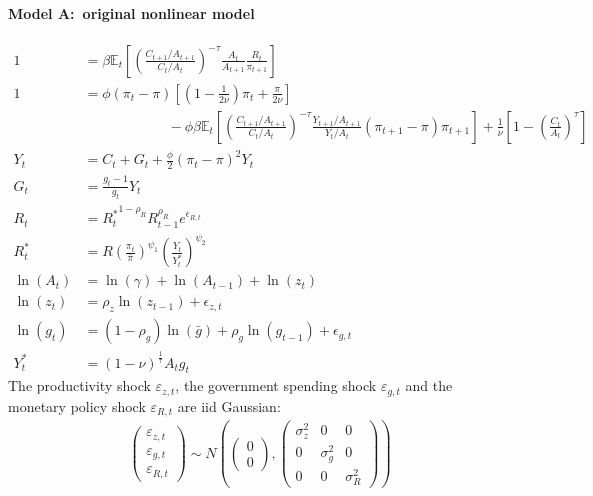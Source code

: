 \paragraph{Model A:\ original nonlinear model}
\begin{align}
1 &= \beta \mathbb{E}_t\left[{\left(\frac{C_{t+1}/A_{t+1}}{C_t/A_t}\right)}^{-\tau} \frac{A_t}{A_{t+1}} \frac{R_t}{\pi_{t+1}}\right]
\\
1 &= \phi \left(\pi_t - \pi\right) \left[\left(1-\frac{1}{2\nu}\right)\pi_t + \frac{\pi}{2\nu}\right] \nonumber
\\&\qquad\qquad\qquad
- \phi \beta \mathbb{E}_t \left[{\left(\frac{C_{t+1}/A_{t+1}}{C_t/A_t}\right)}^{-\tau} \frac{Y_{t+1}/A_{t+1}}{Y_t/A_t} \left(\pi_{t+1} - \pi \right) \pi_{t+1}\right] + \frac{1}{\nu}\left[1-{\left({\frac{C_t}{A_t}}\right)}^{\tau}\right]
\\
Y_t &= C_t + G_t + \frac{\phi}{2} {\left({\pi_t - \pi}\right)}^2 Y_t
\\
G_t &= \frac{g_t-1}{g_t} Y_t
\\
R_t &= {R_t^{*}}^{1-\rho_R} R_{t-1}^{\rho_R} e^{\epsilon_{R,t}}
\\
R_t^* & = R {\left(\frac{\pi_t}{\bar{\pi}}\right)}^{\psi_1} {\left(\frac{Y_t}{Y_t^*}\right)}^{\psi_2}
\\
\ln(A_t) &= \ln(\gamma) + \ln(A_{t-1}) + \ln(z_t)
\\
\ln(z_t) &= \rho_z \ln(z_{t-1}) + \epsilon_{z,t}
\\
\ln(g_t) &= (1-\rho_g)\ln(\bar{g}) + \rho_g \ln(g_{t-1}) + \epsilon_{g,t}
\\
Y_t^* &= {(1-\nu)}^{\frac{1}{\tau}} A_t g_t
\end{align}
The productivity shock \(\varepsilon_{z,t}\), the government spending shock \(\varepsilon_{g,t}\)
  and the monetary policy shock \(\varepsilon_{R,t}\) are iid Gaussian:
\begin{align*}
\begin{pmatrix}
\varepsilon_{z,t}\\\varepsilon_{g,t}\\\varepsilon_{R,t}
\end{pmatrix}
\sim N\left(\begin{pmatrix} 0\\0\end{pmatrix}, \begin{pmatrix} \sigma_z^2 & 0 & 0\\0 & \sigma_{g}^2 &0 \\ 0 & 0 & \sigma_R^2\end{pmatrix}\right)
\end{align*}

